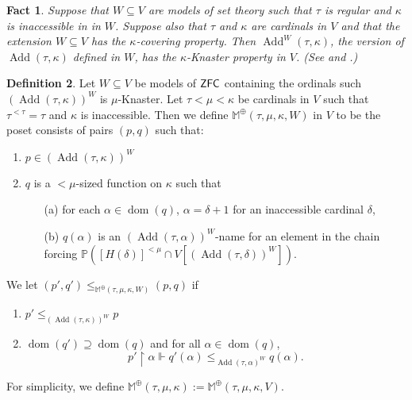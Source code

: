 \documentclass[a4paper]{amsart}
\theoremstyle{definition}
\newtheorem{mydef}{Definition}[section]
\theoremstyle{remark}
\theoremstyle{plain}
\newtheorem{myfact}[mydef]{Fact}
\numberwithin{mydef}{section}
\DeclareMathOperator{\dom}{dom}
\DeclareMathOperator{\Add}{Add}
\newcommand{\dM}{\mathbb{M}}
\newcommand{\dP}{\mathbb{P}}
\newcommand{\uhr}{\upharpoonright}
\begin{document}
	\begin{myfact} Suppose that $W \subseteq V$ are models of set theory such that $\tau$ is regular and $\kappa$ is inaccessible in in $W$. Suppose also that $\tau$ and $\kappa$ are cardinals in $V$ and that the extension $W \subseteq V$ has the $\kappa$-covering property. Then $\Add^W(\tau,\kappa)$, the version of $\Add(\tau,\kappa)$ defined in $W$, has the $\kappa$-Knaster property in $V$. (See \cite[Lemma 2.6]{Cummings-Foreman1998} and \cite{Abraham1983}.)\end{myfact}
	
	
	
	\begin{mydef}\label{DefM3}
		Let $W \subseteq V$ be models of $\textup{\textsf{ZFC}}$ containing the ordinals such $(\Add(\tau,\kappa))^W$ is $\mu$-Knaster. Let $\tau<\mu<\kappa$ be cardinals in $V$ such that $\tau^{<\tau}=\tau$ and $\kappa$ is inaccessible. Then we define $\dM^\oplus(\tau,\mu,\kappa,W)$ in $V$ to be the poset consists of pairs $(p,q)$ such that:
		\begin{enumerate}
			\item $p\in (\Add(\tau,\kappa))^W$
			\item $q$ is a $<\mu$-sized function on $\kappa$ such that
			\begin{itemize}
				\item[(a)] for each $\alpha\in\dom(q)$, $\alpha=\delta+1$ for an inaccessible cardinal $\delta$,
				\item[(b)] $q(\alpha)$ is an $(\Add(\tau,\alpha))^W$-name for an element in the chain forcing $\dP([H(\delta)]^{<\mu}\cap V[(\Add(\tau,\delta))^W])$.
				\end{itemize}
		\end{enumerate}
		We let $(p',q')\leq_{\dM^\oplus(\tau,\mu,\kappa,W)}(p,q)$ if
		\begin{enumerate}
			\item $p'\leq_{(\Add(\tau,\kappa))^W} p$
			\item $\dom(q')\supseteq\dom(q)$ and for all $\alpha\in\dom(q)$,
			$$p'\uhr\alpha\Vdash q'(\alpha)\leq_{\Add(\tau,\alpha)^W} q(\alpha).$$
		\end{enumerate}
		For simplicity, we define $\dM^{\oplus}(\tau,\mu,\kappa):=\dM^{\oplus}(\tau,\mu,\kappa,V)$.
	\end{mydef}
	
\end{document}
